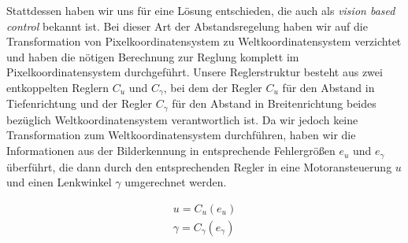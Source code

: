 \documentclass[10pt]{article}
\begin{document}
Stattdessen haben wir uns für eine Lösung entschieden, die auch als \textit{vision based control} bekannt ist. Bei dieser Art der Abstandsregelung haben wir auf die Transformation von Pixelkoordinatensystem zu Weltkoordinatensystem verzichtet und haben die nötigen Berechnung zur Reglung komplett im Pixelkoordinatensystem durchgeführt. Unsere Reglerstruktur besteht aus zwei entkoppelten Reglern $C_u$ und $C_{\gamma}$, bei dem der Regler $C_u$ für den Abstand in Tiefenrichtung und der Regler $C_{\gamma}$ für den Abstand in Breitenrichtung beides bezüglich Weltkoordinatensystem verantwortlich ist. Da wir jedoch keine Transformation zum Weltkoordinatensystem durchführen, haben wir die Informationen aus der Bilderkennung in entsprechende Fehlergrößen $e_u$ und $e_{\gamma}$ überführt, die dann durch den entsprechenden Regler in eine Motoransteuerung $u$ und einen Lenkwinkel $\gamma$ umgerechnet werden.

\begin{eqnarray}
u = C_u(e_u) \\
\gamma = C_{\gamma}(e_{\gamma})
\end{eqnarray}
\end{document}
